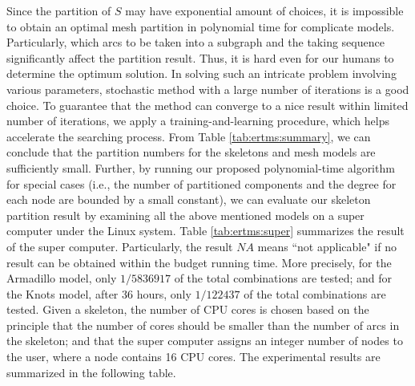 Since the partition of $S$ may have exponential amount of choices, it is impossible to obtain an optimal mesh partition in polynomial time for complicate models. Particularly, which arcs to be taken into a subgraph and the taking sequence significantly affect the partition result. Thus, it is hard even for our humans to determine the optimum solution. In solving such an intricate problem involving various parameters, stochastic method with a large number of iterations is a good choice. To guarantee that the method can converge to a nice result within limited number of iterations, we apply a training-and-learning procedure, which helps accelerate the searching process. From Table \ref{tab:ertms:summary}, we can conclude that the partition numbers for the skeletons and mesh models are sufficiently small. Further, by running our proposed polynomial-time algorithm for special cases (i.e., the number of partitioned components and the degree for each node are bounded by a small constant), we can evaluate our skeleton partition result by examining all the above mentioned models on a super computer under the Linux system. Table \ref{tab:ertms:super} summarizes the result of the super computer. Particularly, the result $NA$ means ``not applicable" if no result can be obtained within the budget running time. More precisely, for the Armadillo model, only $1/5836917$ of the total combinations are tested; and for the Knots model, after 36 hours, only $1/122437$ of the total combinations are tested. Given a skeleton, the number of CPU cores is chosen based on the principle that the number of cores should be smaller than the number of arcs in the skeleton; and that the super computer assigns an integer number of nodes to the user, where a node contains 16 CPU cores. The experimental results are summarized in the following table.


